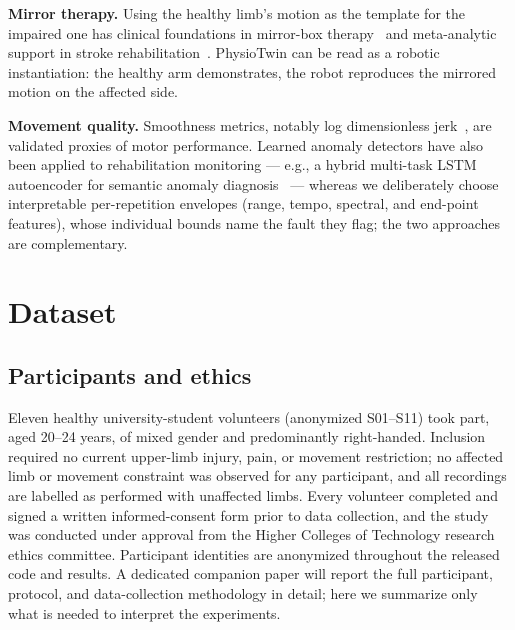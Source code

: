\documentclass[conference]{IEEEtran}
\begin{document}
\textbf{Mirror therapy.} Using the healthy limb's motion as the
template for the impaired one has clinical foundations in mirror-box
therapy~\cite{ramachandran1996} and meta-analytic support in
stroke rehabilitation~\cite{thieme2018}. PhysioTwin can be read as a
robotic instantiation: the healthy arm demonstrates, the robot
reproduces the mirrored motion on the affected side.

\textbf{Movement quality.} Smoothness metrics, notably log
dimensionless jerk~\cite{balasubramanian2015}, are validated proxies
of motor performance. Learned anomaly detectors have also been applied
to rehabilitation monitoring --- e.g., a hybrid multi-task LSTM
autoencoder for semantic anomaly diagnosis~\cite{benachour2026ae} ---
whereas we deliberately choose interpretable per-repetition envelopes
(range, tempo, spectral, and end-point features), whose individual
bounds name the fault they flag; the two approaches are complementary.

\section{Dataset}

\subsection{Participants and ethics}
Eleven healthy university-student volunteers (anonymized S01--S11) took
part, aged 20--24 years, of mixed gender and predominantly
right-handed. Inclusion required no current upper-limb injury, pain, or
movement restriction; no affected limb or movement constraint was
observed for any participant, and all recordings are labelled as
performed with unaffected limbs. Every volunteer completed and signed a
written informed-consent form prior to data collection, and the study
was conducted under approval from the Higher Colleges of Technology
research ethics committee. Participant identities are anonymized
throughout the released code and results. A dedicated companion paper
will report the full participant, protocol, and data-collection
methodology in detail; here we summarize only what is needed to
interpret the experiments.
\end{document}
